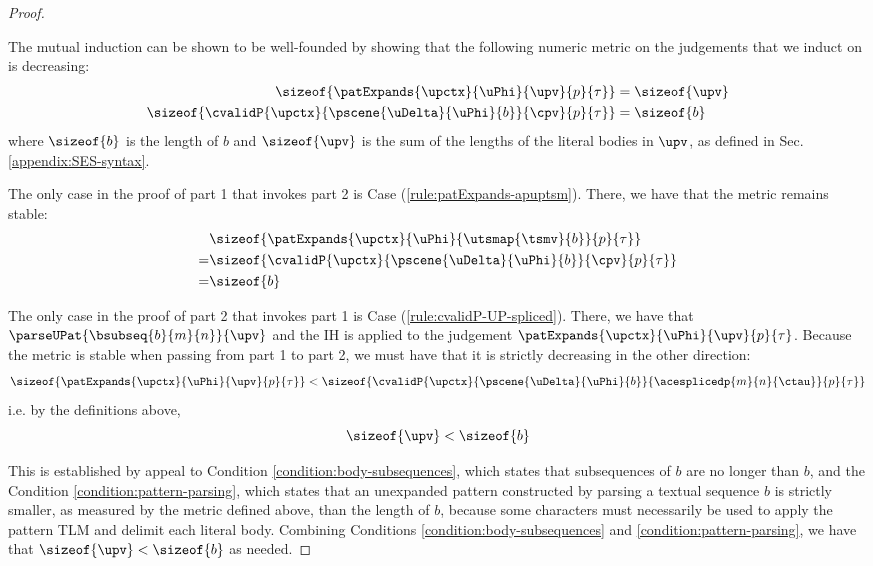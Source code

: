 \begin{grayparbox}
\begin{proof}
\begin{enumerate}
\begin{byCases}
\begin{pfsteps*}
      \end{pfsteps*}
      \resetpfcounter
  \end{byCases}
  \end{enumerate}
The mutual induction can be shown to be well-founded by showing that the following numeric metric on the judgements that we induct on is decreasing:
\begin{align*}
\sizeof{\patExpands{\upctx}{\uPhi}{\upv}{p}{\tau}} & = \sizeof{\upv}\\
\sizeof{{\cvalidP{\upctx}{\pscene{\uDelta}{\uPhi}{b}}{\cpv}{p}{\tau}}} & = \sizeof{b}
\end{align*}
where $\sizeof{b}$ is the length of $b$ and $\sizeof{\upv}$ is the sum of the lengths of the literal bodies in $\upv$, as defined in Sec. \ref{appendix:SES-syntax}.

The only case in the proof of part 1 that invokes part 2 is Case (\ref{rule:patExpands-apuptsm}). There, we have that the metric remains stable: \begin{align*}
 & \sizeof{\patExpands{\upctx}{\uPhi}{\utsmap{\tsmv}{b}}{p}{\tau}}\\
=& \sizeof{{\cvalidP{\upctx}{\pscene{\uDelta}{\uPhi}{b}}{\cpv}{p}{\tau}}}\\
=&\sizeof{b}\end{align*}

The only case in the proof of part 2 that invokes part 1 is Case (\ref{rule:cvalidP-UP-spliced}). There, we have that $\parseUPat{\bsubseq{b}{m}{n}}{\upv}$ and the IH is applied to the judgement $\patExpands{\upctx}{\uPhi}{\upv}{p}{\tau}$. Because the metric is stable when passing from part 1 to part 2, we must have that it is strictly decreasing in the other direction:
\[\sizeof{\patExpands{\upctx}{\uPhi}{\upv}{p}{\tau}} < \sizeof{{\cvalidP{\upctx}{\pscene{\uDelta}{\uPhi}{b}}{\acesplicedp{m}{n}{\ctau}}{p}{\tau}}}\]
i.e. by the definitions above, 
\[\sizeof{\upv} < \sizeof{b}\]

This is established by appeal to Condition \ref{condition:body-subsequences}, which states that subsequences of $b$ are no longer than $b$, and the Condition \ref{condition:pattern-parsing}, which states that an unexpanded pattern constructed by parsing a textual sequence $b$ is strictly smaller, as measured by the metric defined above, than the length of $b$, because some characters must necessarily be used to apply the pattern TLM and delimit each literal body. Combining Conditions \ref{condition:body-subsequences} and \ref{condition:pattern-parsing}, we have that $\sizeof{\upv} < \sizeof{b}$ as needed.
\end{proof}

\end{grayparbox}
